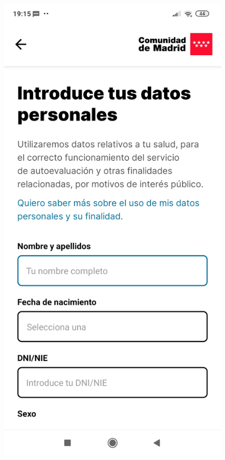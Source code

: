 \documentclass[a4paper, 12pt]{article}
\begin{document}
\begin{figure}[!htb]
   \begin{minipage}{0.33\textwidth}
     \centering
     \includegraphics[scale=0.06]{images/discussion/coronamadrid-1.jpg}

\end{minipage}
\end{figure}
\end{document}
